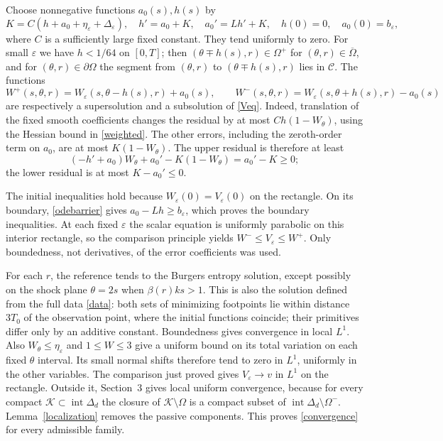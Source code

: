 \documentclass[11pt]{article}
\newcommand{\eps}{\varepsilon}
\begin{document}
Choose nonnegative functions $a_0(s),h(s)$ by
\begin{equation}\label{odebarrier}
 K=C(h+a_0+\eta_\eps+\Delta_\eps),\quad
 h'=a_0+K,\quad a_0'=Lh'+K,\quad
 h(0)=0,\quad a_0(0)=b_\eps,
\end{equation}
where $C$ is a sufficiently large fixed constant. They tend uniformly to zero. For small $\eps$ we have $h<1/64$ on $[0,T]$; then $(\theta\mp h(s),r)\in\Omega^+$ for $(\theta,r)\in\overline\Omega$, and for $(\theta,r)\in\partial\Omega$ the segment from $(\theta,r)$ to $(\theta\mp h(s),r)$ lies in $\mathcal C$. The functions
\[
 W^+(s,\theta,r)=W_\eps(s,\theta-h(s),r)+a_0(s),\qquad
 W^-(s,\theta,r)=W_\eps(s,\theta+h(s),r)-a_0(s)
\]
are respectively a supersolution and a subsolution of \eqref{Veq}. Indeed, translation of the fixed smooth coefficients changes the residual by at most $Ch(1-W_\theta)$, using the Hessian bound in \eqref{weighted}. The other errors, including the zeroth-order term on $a_0$, are at most $K(1-W_\theta)$. The upper residual is therefore at least
\[
 (-h'+a_0)W_\theta+a_0'-K(1-W_\theta)=a_0'-K\ge0;
\]
the lower residual is at most $K-a_0'\le0$.

The initial inequalities hold because $W_\eps(0)=V_\eps(0)$ on the rectangle. On its boundary, \eqref{odebarrier} gives $a_0-Lh\ge b_\eps$, which proves the boundary inequalities. At each fixed $\eps$ the scalar equation is uniformly parabolic on this interior rectangle, so the comparison principle yields $W^-\le V_\eps\le W^+$. Only boundedness, not derivatives, of the error coefficients was used.

For each $r$, the reference tends to the Burgers entropy solution, except possibly on the shock plane $\theta=2s$ when $\beta(r)ks>1$. This is also the solution defined from the full data \eqref{data}: both sets of minimizing footpoints lie within distance $3T_0$ of the observation point, where the initial functions coincide; their primitives differ only by an additive constant. Boundedness gives convergence in local $L^1$. Also $W_\theta\le\eta_\eps$ and $1\le W\le3$ give a uniform bound on its total variation on each fixed $\theta$ interval. Its small normal shifts therefore tend to zero in $L^1$, uniformly in the other variables. The comparison just proved gives $V_\eps\to v$ in $L^1$ on the rectangle. Outside it, Section~3 gives local uniform convergence, because for every compact $\mathcal K\subset\operatorname{int}\Delta_d$ the closure of $\mathcal K\setminus\Omega$ is a compact subset of $\operatorname{int}\Delta_d\setminus\Omega^-$. Lemma~\ref{localization} removes the passive components. This proves \eqref{convergence} for every admissible family.
\end{document}
